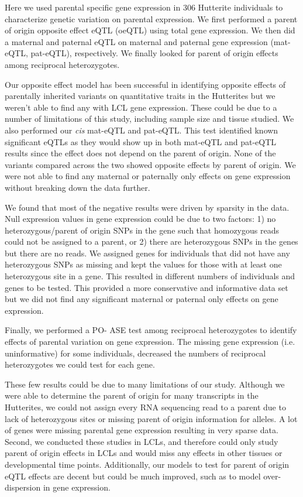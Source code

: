 Here we used parental specific gene expression in 306 Hutterite individuals to characterize genetic variation on parental expression. We first performed a parent of origin opposite effect eQTL (oeQTL) using total gene expression. We then did a maternal and paternal eQTL on maternal and paternal gene expression (mat-eQTL, pat-eQTL), respectively. We finally looked for parent of origin effects among reciprocal heterozygotes.

Our opposite effect model has been successful in identifying opposite effects of parentally inherited variants on quantitative traits in the Hutterites but we weren't able to find any with LCL gene expression. These could be due to a number of limitations of this study, including sample size and tissue studied. We also performed our \emph{cis} mat-eQTL and pat-eQTL. This test identified known significant eQTLs as they would show up in both mat-eQTL and pat-eQTL results since the effect does not depend on the parent of origin. None of the variants compared across the two showed opposite effects by parent of origin. We were not able to find any maternal or paternally only effects on gene expression without breaking down the data further.

We found that most of the negative results were driven by sparsity in the data. Null expression values in gene expression could be due to two factors: 1) no heterozygous/parent of origin SNPs in the gene such that homozygous reads could not be assigned to a parent, or 2) there are heterozygous SNPs in the genes but there are no reads. We assigned genes for individuals that did not have any heterozygous SNPs as missing and kept the values for those with at least one heterozygous site in a gene. This resulted in different numbers of individuals and genes to be tested. This provided a more conservative and informative data set but we did not find any significant maternal or paternal only effects on gene expression.

Finally, we performed a PO- ASE test among reciprocal heterozygotes to identify effects of parental variation on gene expression. The missing gene expression (i.e. uninformative) for some individuals, decreased the numbers of reciprocal heterozygotes we could test for each gene.

These few results could be due to many limitations of our study. Although we were able to determine the parent of origin for many transcripts in the Hutterites, we could not assign every RNA sequencing read to a parent due to lack of heterozygous sites or missing parent of origin information for alleles. A lot of genes were missing parental gene expression resulting in very sparse data. Second, we conducted these studies in LCLs, and therefore could only study parent of origin effects in LCLs and would miss any effects in other tissues or developmental time points. Additionally, our models to test for parent of origin eQTL effects are decent but could be much improved, such as to model over-dispersion in gene expression.

